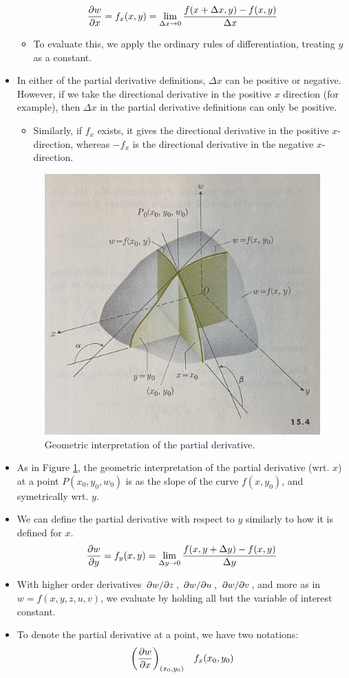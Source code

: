 \documentclass[../main.tex]{subfiles}
\begin{document}
\begin{itemize}
\begin{equation*}
        \pdv{w}{x} = f_x(x,y) = \lim_{\Delta x\to 0}\frac{f(x+\Delta x,y)-f(x,y)}{\Delta x}
    \end{equation*}
    \begin{itemize}
        \item To evaluate this, we apply the ordinary rules of differentiation, treating $y$ as a constant. 
    \end{itemize}
    \item In either of the partial derivative definitions, $\Delta x$ can be positive or negative. However, if we take the directional derivative in the positive $x$ direction (for example), then $\Delta x$ in the partial derivative definitions can only be positive.
    \begin{itemize}
        \item Similarly, if $f_x$ exists, it gives the directional derivative in the positive $x$-direction, whereas $-f_x$ is the directional derivative in the negative $x$-direction.
    \end{itemize}
    \begin{figure}[h!]
        \centering
        \includegraphics[width=0.4\linewidth]{ExtFiles/geometricPartialDv.jpg}
        \caption{Geometric interpretation of the partial derivative.}
        \label{fig:geometricPartialDv}
    \end{figure}
    \item As in Figure \ref{fig:geometricPartialDv}, the geometric interpretation of the partial derivative (wrt. $x$) at a point $P(x_0,y_0,w_0)$ is as the slope of the curve $f(x,y_0)$, and symetrically wrt. $y$.
    \item We can define the partial derivative with respect to $y$ similarly to how it is defined for $x$.
    \begin{equation*}
        \pdv{w}{y} = f_y(x,y) = \lim_{\Delta y\to 0}\frac{f(x,y+\Delta y)-f(x,y)}{\Delta y}
    \end{equation*}
    \item With higher order derivatives $\pdv*{w}{z}$, $\pdv*{w}{u}$, $\pdv*{w}{v}$, and more as in $w=f(x,y,z,u,v)$, we evaluate by holding all but the variable of interest constant.
    \item To denote the partial derivative at a point, we have two notations:
    \begin{align*}
        \left( \pdv{w}{x} \right)_{(x_0,y_0)}&&
            f_x(x_0,y_0)
    \end{align*}
\end{itemize}
\end{document}
